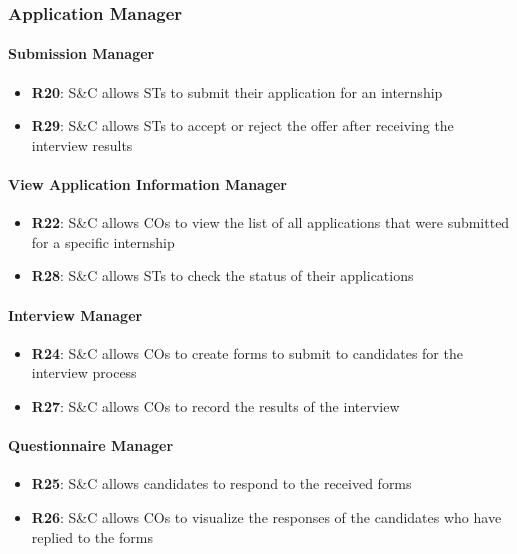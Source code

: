 \subsubsection{Application Manager}
\paragraph{Submission Manager}
\begin{itemize}
    \item \textbf{R20}: S\&C allows STs to submit their application for an internship
    \item \textbf{R29}: S\&C allows STs to accept or reject the offer after receiving the interview results
\end{itemize}

\paragraph{View Application Information Manager}
\begin{itemize}
    \item \textbf{R22}: S\&C allows COs to view the list of all applications that were submitted for a specific internship
    \item \textbf{R28}: S\&C allows STs to check the status of their applications
\end{itemize}

\paragraph{Interview Manager}
\begin{itemize}
    \item \textbf{R24}: S\&C allows COs to create forms to submit to candidates for the interview process
    \item \textbf{R27}: S\&C allows COs to record the results of the interview
\end{itemize}

\paragraph{Questionnaire Manager}
\begin{itemize}
    \item \textbf{R25}: S\&C allows candidates to respond to the received forms
    \item \textbf{R26}: S\&C allows COs to visualize the responses of the candidates who have replied to the forms 
\end{itemize}
